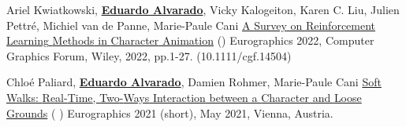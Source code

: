\begin{cventries}
\cvpublication
    {Ariel Kwiatkowski, \textbf{\underline{Eduardo Alvarado}}, Vicky Kalogeiton, Karen C. Liu, Julien Pettr{\'{e}}, Michiel van de Panne, Marie-Paule Cani} %
    {\href{https://edualvarado.com/reinforcement-learning-methods-in-character-animation/}{A {Survey} on {Reinforcement} {Learning} {Methods} in {Character} {Animation}} (\href{https://hal.inria.fr/hal-03600947}{})} %
    {Eurographics 2022, Computer Graphics Forum, Wiley, 2022, pp.1-27. (10.1111/cgf.14504)} %

\cvpublication
    {Chlo{\'{e}} Paliard, \textbf{\underline{Eduardo Alvarado}}, Damien Rohmer, Marie-Paule Cani} %
    {\href{https://edualvarado.com/soft-walks/}{Soft {Walks}: {Real}-{Time}, {Two}-{Ways} {Interaction} between a {Character} and {Loose} {Grounds}} (\href{https://github.com/edualvarado/unity-soft-walks}{} \href{https://hal.inria.fr/hal-03200160/}{} \href{https://www.youtube.com/watch?v=76eIChGWUGw}{})} %
    {Eurographics 2021 (short), May 2021, Vienna, Austria.} %
    
\end{cventries}
